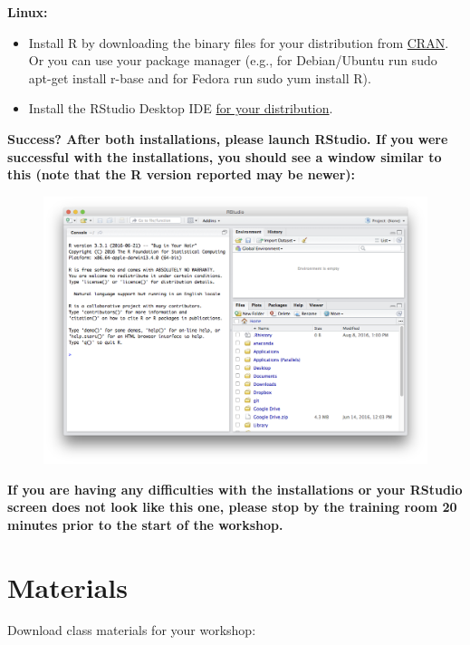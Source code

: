 \documentclass[]{book}
\providecommand{\tightlist}{%
  \setlength{\itemsep}{0pt}\setlength{\parskip}{0pt}}
\begin{document}
\textbf{Linux:}

\begin{itemize}
\tightlist
\item
  Install R by downloading the binary files for your distribution from
  \href{http://cran.r-project.org/index.html}{CRAN}. Or you can use your
  package manager (e.g., for Debian/Ubuntu run sudo apt-get install
  r-base and for Fedora run sudo yum install R).
\item
  Install the RStudio Desktop IDE
  \href{https://rstudio.com/products/rstudio/download/\#download}{for
  your distribution}.
\end{itemize}

\textbf{Success? After both installations, please launch RStudio. If you
were successful with the installations, you should see a window similar
to this (note that the R version reported may be newer):}

\begin{figure}
\centering
\includegraphics{R/Rinstall/images/rstudio_successful_install.png}
\caption{}
\end{figure}

\textbf{If you are having any difficulties with the installations or
your RStudio screen does not look like this one, please stop by the
training room 20 minutes prior to the start of the workshop.}

\section{Materials}\label{materials}

Download class materials for your workshop:
\end{document}
